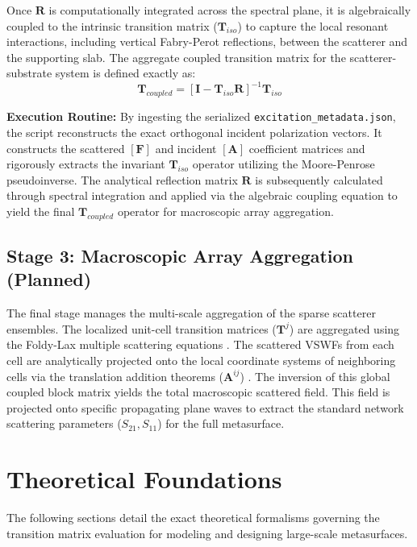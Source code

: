\documentclass[11pt,a4paper]{article}
\begin{document}
Once $\mathbf{R}$ is computationally integrated across the spectral plane, it is algebraically coupled to the intrinsic transition matrix ($\mathbf{T}_{iso}$) to capture the local resonant interactions, including vertical Fabry-Perot reflections, between the scatterer and the supporting slab. The aggregate coupled transition matrix for the scatterer-substrate system is defined exactly as:
\begin{equation}
    \mathbf{T}_{coupled} = \left[ \mathbf{I} - \mathbf{T}_{iso}\mathbf{R} \right]^{-1} \mathbf{T}_{iso}
\end{equation}

\textbf{Execution Routine:} 
By ingesting the serialized \texttt{excitation\_metadata.json}, the script reconstructs the exact orthogonal incident polarization vectors. It constructs the scattered $[\mathbf{F}]$ and incident $[\mathbf{A}]$ coefficient matrices and rigorously extracts the invariant $\mathbf{T}_{iso}$ operator utilizing the Moore-Penrose pseudoinverse. The analytical reflection matrix $\mathbf{R}$ is subsequently calculated through spectral integration and applied via the algebraic coupling equation to yield the final $\mathbf{T}_{coupled}$ operator for macroscopic array aggregation.

\subsection{Stage 3: Macroscopic Array Aggregation (Planned)}
The final stage manages the multi-scale aggregation of the sparse scatterer ensembles. The localized unit-cell transition matrices ($\mathbf{T}^j$) are aggregated using the Foldy-Lax multiple scattering equations \cite{foldy1945multiple, tsang2001scattering}. The scattered VSWFs from each cell are analytically projected onto the local coordinate systems of neighboring cells via the translation addition theorems ($\mathbf{A}^{ij}$) \cite{tsang2001scattering}. The inversion of this global coupled block matrix yields the total macroscopic scattered field. This field is projected onto specific propagating plane waves to extract the standard network scattering parameters ($S_{21}, S_{11}$) for the full metasurface.

\section{Theoretical Foundations} \label{sec:theory}
The following sections detail the exact theoretical formalisms governing the transition matrix evaluation for modeling and designing large-scale metasurfaces.
\end{document}
